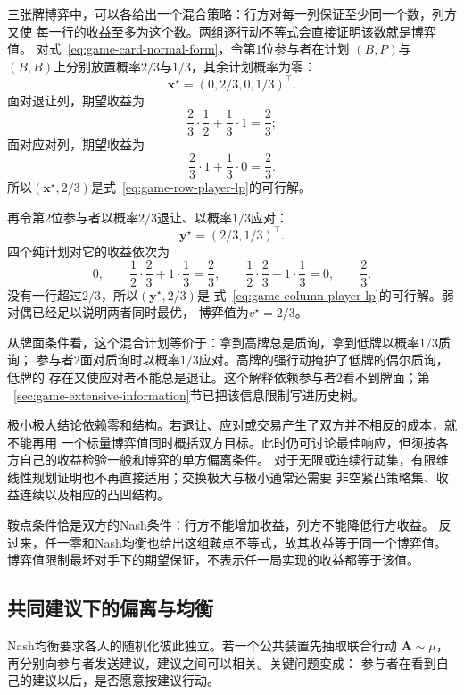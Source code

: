 三张牌博弈中，可以各给出一个混合策略：行方对每一列保证至少同一个数，列方又使
每一行的收益至多为这个数。两组逐行动不等式会直接证明该数就是博弈值。
对式~\eqref{eq:game-card-normal-form}，令第1位参与者在计划
\((B,P)\)与\((B,B)\)上分别放置概率\(2/3\)与\(1/3\)，其余计划概率为零：
\[
  \bm{x}^\star
  =
  (0,2/3,0,1/3)^{\top}.
\]
面对退让列，期望收益为
\[
  \frac23\cdot\frac12+\frac13\cdot1
  =
  \frac23;
\]
面对应对列，期望收益为
\[
  \frac23\cdot1+\frac13\cdot0
  =
  \frac23.
\]
所以\((\bm{x}^\star,2/3)\)是式~\eqref{eq:game-row-player-lp}的可行解。

再令第2位参与者以概率\(2/3\)退让、以概率\(1/3\)应对：
\[
  \bm{y}^\star=(2/3,1/3)^{\top}.
\]
四个纯计划对它的收益依次为
\[
  0,\qquad
  \frac12\cdot\frac23+1\cdot\frac13=\frac23,\qquad
  \frac12\cdot\frac23-1\cdot\frac13=0,\qquad
  \frac23.
\]
没有一行超过\(2/3\)，所以\((\bm{y}^\star,2/3)\)是
式~\eqref{eq:game-column-player-lp}的可行解。弱对偶已经足以说明两者同时最优，
博弈值为\(v^\star=2/3\)。

从牌面条件看，这个混合计划等价于：拿到高牌总是质询，拿到低牌以概率\(1/3\)质询；
参与者2面对质询时以概率\(1/3\)应对。高牌的强行动掩护了低牌的偶尔质询，低牌的
存在又使应对者不能总是退让。这个解释依赖参与者2看不到牌面；第
~\ref{sec:game-extensive-information}节已把该信息限制写进历史树。

极小极大结论依赖零和结构。若退让、应对或交易产生了双方并不相反的成本，就不能再用
一个标量博弈值同时概括双方目标。此时仍可讨论最佳响应，但须按各方自己的收益检验一般和博弈的单方偏离条件。
对于无限或连续行动集，有限维线性规划证明也不再直接适用；交换极大与极小通常还需要
非空紧凸策略集、收益连续以及相应的凸凹结构。

鞍点条件恰是双方的Nash条件：行方不能增加收益，列方不能降低行方收益。
反过来，任一零和Nash均衡也给出这组鞍点不等式，故其收益等于同一个博弈值。
博弈值限制最坏对手下的期望保证，不表示任一局实现的收益都等于该值。

\subsection{共同建议下的偏离与均衡}
\label{sec:game-correlated-deviations}

Nash均衡要求各人的随机化彼此独立。若一个公共装置先抽取联合行动
\(\bm{A}\sim\mu\)，再分别向参与者发送建议，建议之间可以相关。关键问题变成：
参与者在看到自己的建议以后，是否愿意按建议行动。

